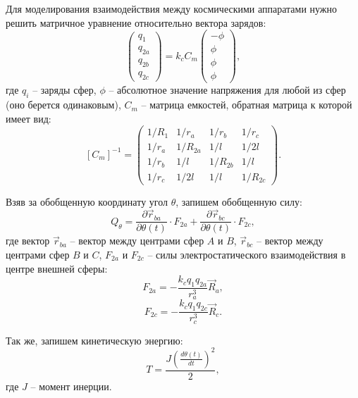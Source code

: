 Для моделирования взаимодействия между космическими аппаратами нужно решить матричное уравнение относительно вектора зарядов:
\begin{equation*}
\label{eq:3sph_q_eq}
	\begin{pmatrix}
		q_1\\
		q_{2a}\\
		q_{2b}\\
		q_{2c}
	\end{pmatrix}
	= k_c C_m 
	\begin{pmatrix}
		-\phi\\
		\phi\\
		\phi\\
		\phi
	\end{pmatrix},
\end{equation*}
где $q_i$ – заряды сфер, $\phi$ – абсолютное значение напряжения для любой из сфер (оно берется одинаковым), $C_m$ – матрица емкостей, обратная матрица к которой имеет вид:
\begin{equation*}
\label{eq:3sph_cm}
	[C_m]^{-1} = 
	\begin{pmatrix}
		1/R_1	&	1/r_a	&	1/r_b	&	1/r_c\\
		1/r_a	&	1/R_{2a}	&	1/l		&	1/2l\\
		1/r_b	&	1/l		&	1/R_{2b}	&	1/l\\
		1/r_c	&	1/2l		&	1/l		&	1/R_{2c}
	\end{pmatrix}.
\end{equation*}

Взяв за обобщенную координату угол $\theta$, запишем обобщенную силу:
\begin{equation*}
\label{eq:3sph_Qj}
	Q_\theta = \frac{\partial \vec{r}_{ba}}{\partial \theta(t)} \cdot F_{2a} + \frac{\partial \vec{r}_{bc}}{\partial \theta(t)} \cdot F_{2c},
\end{equation*}
где вектор $\vec{r}_{ba}$ – вектор между центрами сфер $A$ и $B$, $\vec{r}_{bc}$ – вектор между центрами сфер $B$ и $C$, $F_{2a}$ и $F_{2c}$ – силы электростатического взаимодействия в центре внешней сферы:
\begin{equation*}
\label{eq:3sph_F2a}
	F_{2a} = - \frac{k_c q_1 q_{2a}}{r_a^3} \vec{R}_a,
\end{equation*}
\begin{equation*}
\label{eq:3sph_F2c}
	F_{2c} = - \frac{k_c q_1 q_{2c}}{r_c^3} \vec{R}_c.
\end{equation*}

Так же, запишем кинетическую энергию:
\begin{equation*}
\label{eq:3sph_kin}
	T = \frac{J \left(\frac{d \theta (t)}{dt}\right)^2}{2},
\end{equation*}
где $J$ – момент инерции.

